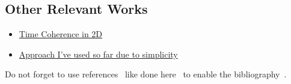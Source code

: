 \subsection{Other Relevant Works}
\begin{itemize}
    \item \href{https://www.cs.purdue.edu/homes/xmt/papers/Coherent-Streamline_Tsinghua_2012.pdf}{Time Coherence in 2D}
    \item \href{https://www.cg.tuwien.ac.at/courses/Visualisierung1/2015W/exercises/Streamlines_Jobard&Lefer.pdf}{Approach I've used so far due to simplicity}
\end{itemize}

Do not forget to use references~\cite{Hanser2019energy} like done here~\cite{Hofmann2019dependentVectors} to enable the bibliography~\cite{Jung2017tumble, Sagrista2019GaiaSky, Sdeo2018fullerene, Zheng2019equivalence}.